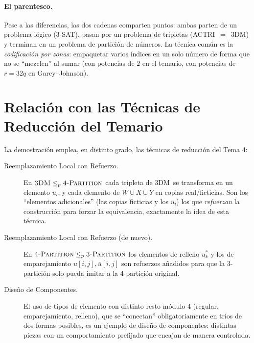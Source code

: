 \documentclass[12pt,a4paper]{article}
\theoremstyle{definition}
\theoremstyle{remark}
\newcommand{\TPART}{\textsc{3-Partition}}
\newcommand{\FPART}{\textsc{4-Partition}}
\newcommand{\DM}{\textsc{3DM}}
\begin{document}
\paragraph{El parentesco.} Pese a las diferencias, las dos cadenas comparten puntos:
ambas parten de un problema lógico (3-SAT), pasan por un problema de tripletas
(ACTRI~$=$~\DM) y terminan en un problema de partición de números. La técnica común
es la \emph{codificación por zonas}: empaquetar varios índices en un solo número de
forma que no se ``mezclen'' al sumar (con potencias de $2$ en el temario, con
potencias de $r=32q$ en Garey--Johnson).

\section{Relación con las Técnicas de Reducción del Temario}

La demostración emplea, en distinto grado, las técnicas de reducción del Tema 4:

\begin{description}
  \item[Reemplazamiento Local con Refuerzo.]
        En $\DM \leq_p \FPART$ cada tripleta de \DM\ se transforma en un elemento
        $u_l$, y cada elemento de $W\cup X\cup Y$ en copias real/ficticias. Son los
        ``elementos adicionales'' (las copias ficticias y los $u_l$) los que
        \emph{refuerzan} la construcción para forzar la equivalencia, exactamente la
        idea de esta técnica.

  \item[Reemplazamiento Local con Refuerzo (de nuevo).]
        En $\FPART \leq_p \TPART$ los elementos de relleno $u_k^*$ y los de
        emparejamiento $u[i,j], \bar u[i,j]$ son refuerzos añadidos para que la
        3-partición solo pueda imitar a la 4-partición original.

  \item[Diseño de Componentes.]
        El uso de tipos de elemento con distinto resto módulo 4 (regular,
        emparejamiento, relleno), que se ``conectan'' obligatoriamente en tríos de
        dos formas posibles, es un ejemplo de diseño de componentes: distintas
        piezas con un comportamiento prefijado que encajan de manera controlada.
\end{description}

\end{document}

